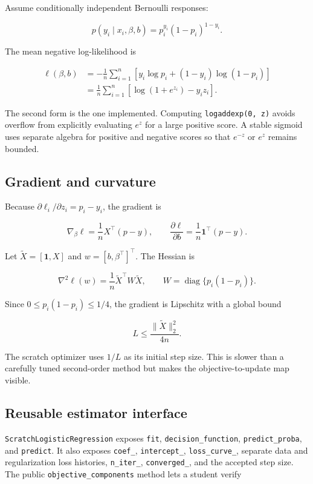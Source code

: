 \documentclass[11pt]{article}
\newcommand{\code}[1]{\texttt{#1}}
\begin{document}
Assume conditionally independent Bernoulli responses:

\[
 p(y_i\mid x_i,\beta,b)=p_i^{y_i}(1-p_i)^{1-y_i}.
\]

The mean negative log-likelihood is

\begin{align*}
\ell(\beta,b)
&=-\frac1n\sum_{i=1}^n\left[y_i\log p_i+(1-y_i)\log(1-p_i)\right]\\
&=\frac1n\sum_{i=1}^n\left[\log(1+e^{z_i})-y_i z_i\right].
\end{align*}

The second form is the one implemented. Computing
\code{logaddexp(0, z)} avoids overflow from explicitly evaluating $e^z$ for a
large positive score. A stable sigmoid uses separate algebra for positive and
negative scores so that $e^{-z}$ or $e^z$ remains bounded.

\subsection{Gradient and curvature}

Because $\partial\ell_i/\partial z_i=p_i-y_i$, the gradient is

\[
 \nabla_\beta\ell=\frac1nX^\top(p-y),
 \qquad
 \frac{\partial\ell}{\partial b}=\frac1n\mathbf{1}^\top(p-y).
\]

Let $\tilde X=[\mathbf{1},X]$ and $w=[b,\beta^\top]^\top$. The Hessian is

\[
 \nabla^2\ell(w)=\frac1n\tilde X^\top W\tilde X,
 \qquad W=\operatorname{diag}\{p_i(1-p_i)\}.
\]

Since $0\le p_i(1-p_i)\le 1/4$, the gradient is Lipschitz with a global bound

\[
 L\le \frac{\lVert\tilde X\rVert_2^2}{4n}.
\]

The scratch optimizer uses $1/L$ as its initial step size. This is slower than a
carefully tuned second-order method but makes the objective-to-update map visible.

\subsection{Reusable estimator interface}

\code{ScratchLogisticRegression} exposes
\code{fit}, \code{decision\_function}, \code{predict\_proba}, and
\code{predict}. It also exposes \code{coef\_}, \code{intercept\_},
\code{loss\_curve\_}, separate data and regularization loss histories,
\code{n\_iter\_}, \code{converged\_}, and the accepted step size. The public
\code{objective\_components} method lets a student verify
\end{document}
